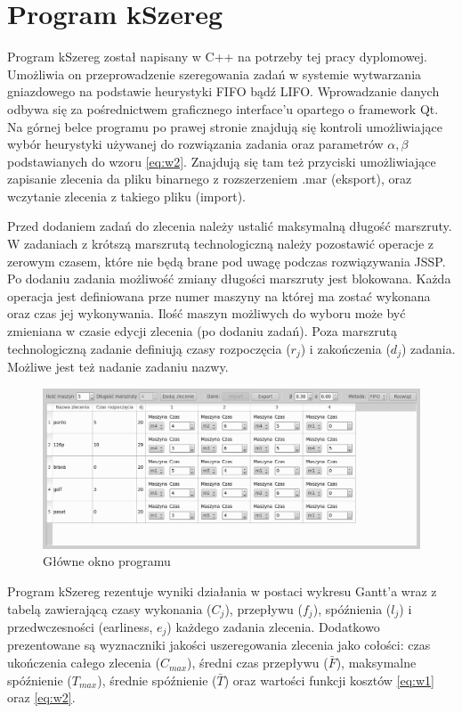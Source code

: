 \documentclass[twoside]{kInzynierka}
\begin{document}
\section        {Program kSzereg}
Program kSzereg został napisany w C++ na potrzeby tej pracy dyplomowej. Umożliwia on przeprowadzenie szeregowania zadań w systemie wytwarzania gniazdowego na podstawie heurystyki FIFO bądź LIFO. Wprowadzanie danych odbywa się za pośrednictwem graficznego interface'u opartego o framework Qt. Na górnej belce programu po prawej stronie znajdują się kontroli umożliwiające wybór heurystyki używanej do rozwiązania zadania oraz parametrów \(\alpha, \beta\) podstawianych do wzoru \eqref{eq:w2}. Znajdują się tam też przyciski umożliwiające zapisanie zlecenia da pliku binarnego z rozszerzeniem .mar (eksport), oraz wczytanie zlecenia z takiego pliku (import). 

Przed dodaniem zadań do zlecenia należy ustalić maksymalną długość marszruty. W zadaniach z krótszą marszrutą technologiczną należy pozostawić operacje z zerowym czasem, które nie będą brane pod uwagę podczas rozwiązywania JSSP. Po dodaniu zadania możliwość zmiany długości marszruty jest blokowana. Każda operacja jest definiowana prze numer maszyny na której ma zostać wykonana oraz czas jej wykonywania. Ilość maszyn możliwych do wyboru może być zmieniana w czasie edycji zlecenia (po dodaniu zadań). Poza marszrutą technologiczną zadanie definiują czasy rozpoczęcia (\(r_j\)) i zakończenia (\(d_j\)) zadania. Możliwe jest też nadanie zadaniu nazwy.

\begin{figure}[htb]
    \centering
    \includegraphics[width=\textwidth, keepaspectratio=true]{./obrazki/main}
    \caption{Główne okno programu}
\end{figure}

Program kSzereg rezentuje wyniki działania w postaci wykresu Gantt'a wraz z tabelą zawierającą czasy wykonania (\(C_j\)), przepływu (\(f_j\)), spóźnienia (\(l_j\)) i przedwczesności (earliness, \(e_j\)) każdego zadania zlecenia. Dodatkowo prezentowane są wyznaczniki jakości uszeregowania zlecenia jako cołości: czas ukończenia całego zlecenia (\(C_{max}\)), średni czas przepływu (\( \bar{F} \)), maksymalne spóźnienie (\(T_{max}\)), średnie spóźnienie (\(\bar{T}\)) oraz wartości funkcji kosztów \eqref{eq:w1} oraz \eqref{eq:w2}.
\end{document}
